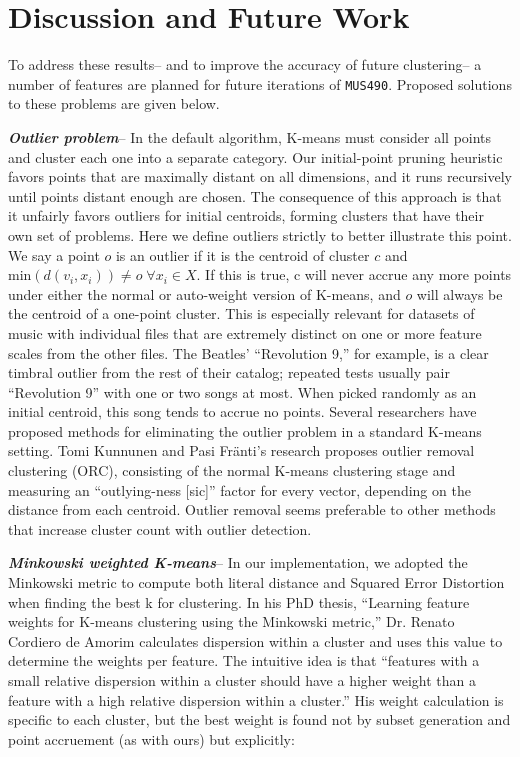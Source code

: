 \documentclass[12pt,twocolumn,titlepage]{article}
\begin{document}
\section{Discussion and Future Work}
\label{sec:future}

	
To address these results-- and to improve the accuracy of future clustering-- a number of features are planned for future iterations of \texttt{MUS490}. Proposed solutions to these problems are given below.

\emph{\textbf{Outlier problem}}-- In the default algorithm, K-means must consider all points and cluster each one into a separate category. Our initial-point pruning heuristic favors points that are maximally distant on all dimensions, and it runs recursively until points distant enough are chosen. The consequence of this approach is that it unfairly favors outliers for initial centroids, forming clusters that have their own set of problems. Here we define outliers strictly to better illustrate this point. We say a point $o$ is an outlier if it is the centroid of cluster $c$ and $\mathrm{min}(d(v_i, x_i)) \neq o \; \forall x_i \in X$. If this is true, c will never accrue any more points under either the normal or auto-weight version of K-means, and $o$ will always be the centroid of a one-point cluster. This is especially relevant for datasets of music with individual files that are extremely distinct on one or more feature scales from the other files. The Beatles' ``Revolution 9,'' for example, is a clear timbral outlier from the rest of their catalog; repeated tests usually pair ``Revolution 9'' with one or two songs at most. When picked randomly as an initial centroid, this song tends to accrue no points.
Several researchers have proposed methods for eliminating the outlier problem in a standard K-means setting. Tomi Kunnunen and Pasi Fr\"{a}nti's research proposes outlier removal clustering (ORC), consisting of the normal K-means clustering stage and measuring an ``outlying-ness [sic]'' factor for every vector, depending on the distance from each centroid. \cite{OutlierRemoval} \cite{Marghny} Outlier removal seems preferable to other methods that increase cluster count with outlier detection. 

\emph{\textbf{Minkowski weighted K-means}}-- In our implementation, we adopted the Minkowski metric to compute both literal distance and Squared Error Distortion when finding the best k for clustering. In his PhD thesis, ``Learning feature weights for K-means clustering using the Minkowski metric,'' Dr. Renato Cordiero de Amorim calculates dispersion within a cluster and uses this value to determine the weights per feature. The intuitive idea is that ``features with a small relative dispersion within a cluster should have a higher weight than a feature with a high relative dispersion within a cluster.'' \cite{MinkWeightedK} His weight calculation is specific to each cluster, but the best weight is found not by subset generation and point accruement (as with ours) but explicitly: 
\end{document}
